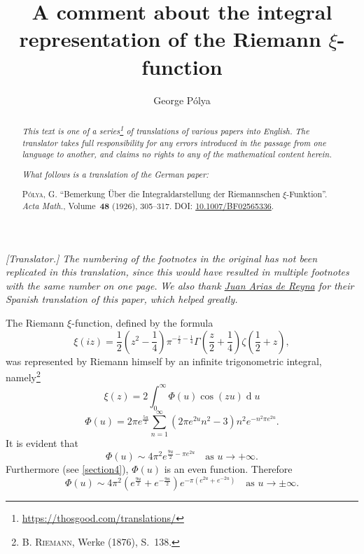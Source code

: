 \documentclass{article}
\title{A comment about the integral representation of the Riemann $\xi$-function}
\author{George P\'{o}lya}
\date{}
\theoremstyle{plain}
\newcommand{\dd}{\operatorname{d}\!}
\newcommand{\oldpage}[1]{\marginpar{\footnotesize$\Big\vert$ \textit{p.~#1}}}
\begin{document}
\maketitle
\thispagestyle{fancy}

\renewcommand{\abstractname}{Translator's note.}

\begin{abstract}
  \renewcommand*{\thefootnote}{\fnsymbol{footnote}}
  \emph{This text is one of a series\footnote{\url{https://thosgood.com/translations/}} of translations of various papers into English.}
  \emph{The translator takes full responsibility for any errors introduced in the passage from one language to another, and claims no rights to any of the mathematical content herein.}

  \medskip
  
  \emph{What follows is a translation of the German paper:}

  \medskip\noindent
  \textsc{P\'{o}lya, G.}
  ``Bemerkung \"{U}ber die Integraldarstellung der Riemannschen $\xi$-Funktion''.
  \emph{Acta Math.}, Volume~\textbf{48} (1926), 305--317.
  \textsc{DOI:} \href{https://doi.org/10.1007/BF02565336}{10.1007/BF02565336}.
\end{abstract}

\setcounter{footnote}{0}

\bigskip



\emph{[Translator.] The numbering of the footnotes in the original has not been replicated in this translation, since this would have resulted in multiple footnotes with the same number on one page.}
\emph{We also thank \href{https://personal.us.es/arias/}{Juan Arias de Reyna} for their Spanish translation of this paper, which helped greatly.}

\bigskip

The Riemann $\xi$-function, defined by the formula
\oldpage{305}
\[
\label{1}
  \xi(iz)
  =
  \frac12 \left(
    z^2 - \frac14
  \right) \pi^{-\frac{z}{2}-\frac14} \Gamma \left(
    \frac{z}{2} + \frac14
  \right) \zeta \left(
    \frac12 + z
  \right),
\tag{1}
\]
was represented by Riemann himself by an infinite trigonometric integral, namely\footnote{\textsc{B. Riemann}, Werke (1876), S.~138.}
\[
\label{2}
  \xi(z) = 2\int_0^\infty \Phi(u)\cos(zu)\dd u
\tag{2}
\]
\[
\label{3}
  \Phi(u) = 2\pi e^{\frac{5u}{2}} \sum_{n=1}^\infty (2\pi e^{2u}n^2 - 3) n^2 e^{-n^2\pi e^{2u}}.
\tag{3}
\]
It is evident that
\[
\label{4}
  \Phi(u) \sim 4\pi^2 e^{\frac{9u}{2}-\pi e^{2u}}
  \quad\mbox{as $u\to+\infty$.}
\tag{4}
\]
Furthermore (see \cref{section4}), $\Phi(u)$ is an even function.
Therefore
\[
\label{5}
  \Phi(u) \sim 4\pi^2 \left(
    e^{\frac{9u}{2}} + e^{-\frac{9u}{2}}
  \right) e^{-\pi(e^{2u}+e^{-2u})}
  \quad\mbox{as $u\to\pm\infty$.}
\tag{5}
\]
\end{document}
